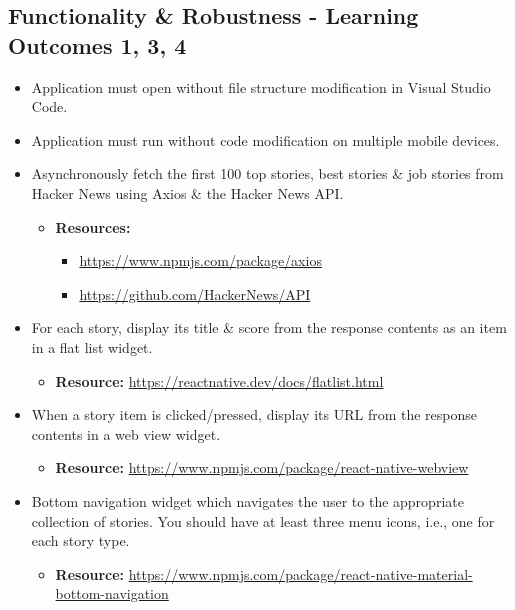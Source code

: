 \documentclass{article}
\begin{document}
\subsection*{Functionality \& Robustness - Learning Outcomes 1, 3, 4}
\begin{itemize}
    \item Application must open without file structure modification in Visual Studio Code.
    \item Application must run without code modification on multiple mobile devices.
    \item Asynchronously fetch the first 100 top stories, best stories \& job stories from Hacker News using Axios \& the Hacker News API.
    \begin{itemize}
        \item \textbf{Resources:}
        \begin{itemize}
            \item \footnotesize\href{https://www.npmjs.com/package/axios}{https://www.npmjs.com/package/axios}
            \item \footnotesize\href{https://github.com/HackerNews/API}{https://github.com/HackerNews/API}
        \end{itemize}
    \end{itemize}
    \item For each story, display its title \& score from the response contents as an item in a flat list widget.
    \begin{itemize}
        \item \textbf{Resource:} \footnotesize\href{https://reactnative.dev/docs/flatlist.html}{https://reactnative.dev/docs/flatlist.html}
    \end{itemize}
    \item When a story item is clicked/pressed, display its URL from the response contents in a web view widget.
    \begin{itemize}
        \item \textbf{Resource:} \footnotesize\href{https://www.npmjs.com/package/react-native-webview}{https://www.npmjs.com/package/react-native-webview}
    \end{itemize}
    \item Bottom navigation widget which navigates the user to the appropriate collection of stories. You should have at least three menu icons, i.e., one for each story type. 
    \begin{itemize}
        \item \textbf{Resource:} \footnotesize\href{https://www.npmjs.com/package/react-native-material-bottom-navigation}{https://www.npmjs.com/package/react-native-material-bottom-navigation}

\end{itemize}
\end{itemize}
\end{document}
